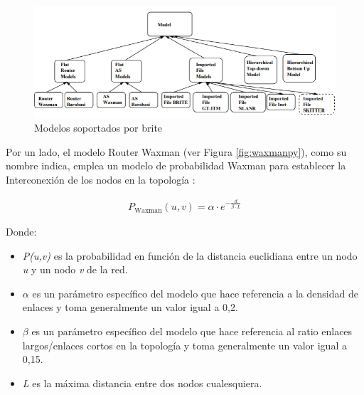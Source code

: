 \vspace{3mm}

\begin{figure}[h!]
    \centering
    \includegraphics[width=1\textwidth]{img/teoria/brite.PNG}
    \caption{Modelos soportados por \acrshort{brite} \cite{brite}}
    \label{fig:brite}
\end{figure}

\vspace{3mm}

Por un lado, el modelo Router Waxman (ver Figura \ref{fig:waxmanpy}), como su nombre indica, emplea un modelo de probabilidad Waxman para establecer la Interconexión de los nodos en la topología \cite{brite_zegura}:

\begin{equation}
    \begin{aligned}
        P_{\text{Waxman}}(u,v) = \alpha \cdot e^{-\frac{d}{\beta \cdot L}}
    \end{aligned}
\end{equation} 

\pagebreak

    Donde:
\begin{itemize}
    \renewcommand{\labelitemi}{}
    \item \textit{P(u,v)} es la probabilidad en función de la distancia euclidiana entre un nodo \textit{u} y un nodo \textit{v} de la red.
    \item $\alpha$ es un parámetro específico del modelo que hace referencia a la densidad de enlaces y toma generalmente un valor igual a 0,2.
    \item $\beta$ es un parámetro específico del modelo que hace referencia al ratio enlaces largos/enlaces cortos en la topología y toma generalmente un valor igual a 0,15.
    \item \textit{L} es la máxima distancia entre dos nodos cualesquiera.
\end{itemize}

